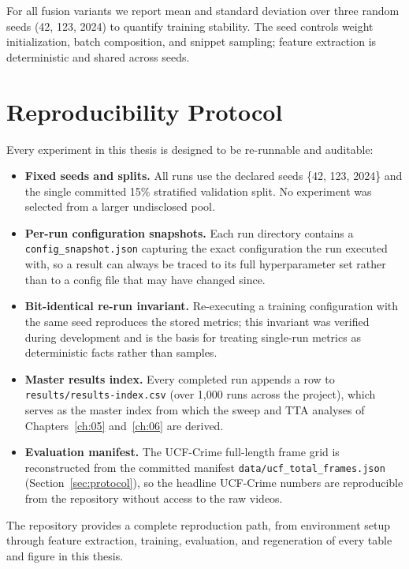 For all fusion variants we report mean and standard deviation over three
random seeds (42, 123, 2024) to quantify training stability. The seed controls
weight initialization, batch composition, and snippet sampling; feature
extraction is deterministic and shared across seeds.

\section{Reproducibility Protocol}
\label{sec:repro}

Every experiment in this thesis is designed to be re-runnable and auditable:

\begin{itemize}
    \item \textbf{Fixed seeds and splits.} All runs use the declared seeds
    \{42, 123, 2024\} and the single committed 15\% stratified validation
    split. No experiment was selected from a larger undisclosed pool.
    \item \textbf{Per-run configuration snapshots.} Each run directory
    contains a \texttt{config\_\allowbreak snapshot.json} capturing the exact
    configuration the run executed with, so a result can always be traced to
    its full hyperparameter set rather than to a config file that may have
    changed since.
    \item \textbf{Bit-identical re-run invariant.} Re-executing a training
    configuration with the same seed reproduces the stored metrics; this
    invariant was verified during development and is the basis for treating
    single-run metrics as deterministic facts rather than samples.
    \item \textbf{Master results index.} Every completed run appends a row to
    \texttt{results/\allowbreak results-index.csv} (over 1,000 runs across the project),
    which serves as the master index from which the sweep and TTA analyses of
    Chapters~\ref{ch:05} and~\ref{ch:06} are derived.
    \item \textbf{Evaluation manifest.} The UCF-Crime full-length frame grid
    is reconstructed from the committed manifest
    \texttt{data/ucf\_total\_frames.json} (Section~\ref{sec:protocol}), so the
    headline UCF-Crime numbers are reproducible from the repository without
    access to the raw videos.
\end{itemize}

The repository provides a complete reproduction path, from
environment setup through feature extraction, training, evaluation, and
regeneration of every table and figure in this thesis.

